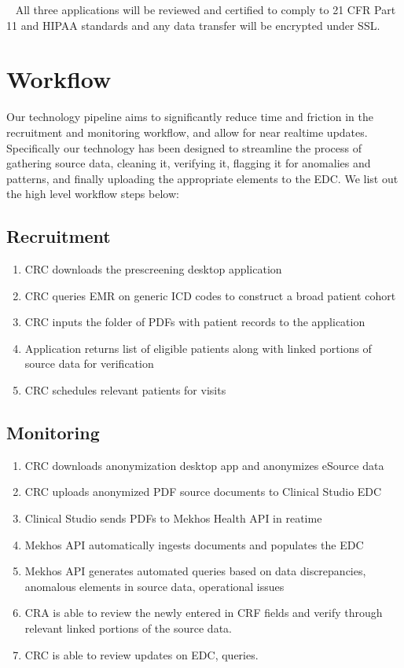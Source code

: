 \documentclass[12pt]{article}
\begin{document}
~\linebreak
\noindent
All three applications will be reviewed and certified to comply to 21 CFR Part 11 and HIPAA standards and any data transfer will be encrypted under SSL.  


\section{Workflow}
\noindent
Our technology pipeline aims to significantly reduce time and friction in the recruitment and monitoring workflow, and allow for near realtime updates. Specifically our technology has been designed to streamline the process of gathering source data, cleaning it, verifying it, flagging it for anomalies and patterns, and finally uploading the appropriate elements to the EDC. We list out the high level workflow steps below:

\subsection{Recruitment}
\begin{enumerate}
\item CRC downloads the prescreening desktop application
\item CRC queries EMR on generic ICD codes to construct a broad patient cohort
\item CRC inputs the folder of PDFs with patient records to the application
\item Application returns list of eligible patients along with linked portions of source data for verification
\item CRC schedules relevant patients for visits 
\end{enumerate}

\subsection{Monitoring}
\begin{enumerate}
\item CRC downloads anonymization desktop app and anonymizes eSource data
\item CRC uploads anonymized PDF source documents to Clinical Studio EDC
\item Clinical Studio sends PDFs to Mekhos Health API in reatime
\item Mekhos API automatically ingests documents and populates the EDC
\item Mekhos API generates automated queries based on data discrepancies, anomalous elements in source data, operational issues
\item CRA is able to review the newly entered in CRF fields and verify through relevant linked portions of the source data. 
\item CRC is able to review updates on EDC, queries.
\end{enumerate}
\end{document}
